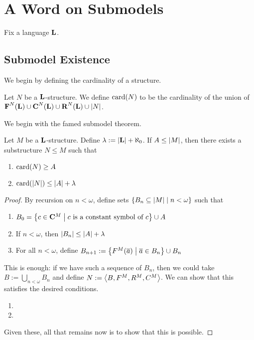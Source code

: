 \section{A Word on Submodels}

Fix a language $\mathbf{L}$.

\subsection{Submodel Existence}

We begin by defining the cardinality of a structure.

\begin{boxdefinition}
    Let $N$ be a $\mathbf{L}$-structure. We define $\operatorname{card}\!\left( N \right)$ to be the cardinality of the union of $\textbf{F}^N(\mathbf{L})\cup \textbf{C}^N(\mathbf{L})\cup \textbf{R}^N(\mathbf{L})\cup |N|$.
\end{boxdefinition}

We begin with the famed submodel theorem.

\begin{boxtheorem}\label{Ch1:Thm:Submodel_Thm}
    Let $M$ be a $\mathbf{L}$-structure. Define $\lambda := \left\lvert \mathbf{L} \right\rvert + \aleph_{0}$. If $A \leq \left\lvert M \right\rvert$, then there exists a substructure $N \leq M$ such that
    \begin{enumerate}[label = (\alph*)]
        \item $\operatorname{card}\!\left( N \right) \geq A$
        \item $\operatorname{card}\!\left( \left\lvert N \right\rvert \right) \leq \left\lvert A \right\rvert + \lambda$
    \end{enumerate}
\end{boxtheorem}
\begin{proof}
    By recursion on $n < \omega$, define sets $\left\{ B_{n} \subseteq \left\lvert M \right\rvert \; \middle\vert \; n < \omega \right\}$ such that
    \begin{enumerate}
        \item $B_{0} = \left\{ c \in \mathbf{C}^M \; \middle\vert \; c \text{ is a constant symbol of } c \right\} \cup A$
        \item If $n < \omega$, then $\left\lvert B_n \right\rvert \leq \left\lvert A \right\rvert + \lambda$
        \item For all $n < \omega$, define $B_{n+1} := \left\{ F^M\!\left( \overline{a} \right) \; \middle\vert \; \overline{a} \in B_{n} \right\} \cup B_n$
    \end{enumerate}
    This is enough: if we have such a sequence of $B_n$, then we could take $B := \bigcup_{n < \omega} B_n$ and define $N := \left\langle B, F^M, R^M, C^M \right\rangle$. We can show that this satisfies the desired conditions.
    \begin{enumerate}[label = (\alph*)]
        \item \sorry
        \item \sorry
    \end{enumerate}

    Given these, all that remains now is to show that this is possible. \sorry{}
\end{proof}

